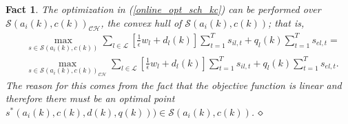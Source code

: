 \documentclass[conference]{IEEEtran}
\newtheorem{fact}{Fact}
\begin{document}
\begin{fact}
\label{fact_online_opt_kc}
The optimization in (\ref{online_opt_sch_kc}) can be performed over $\mathcal{S}(a_i(k),c(k))_\mathcal{CH}$, the convex hull of $\mathcal{S}(a_i(k),c(k))$; that is,
\begin{align*}
	& \max\limits_{s \in \mathcal{S}(a_i(k),c(k))} \sum\limits_{l \in \mathcal{L}} [\frac{1}{\epsilon} w_l+d_l(k)] \sum_{t=1}^{T} s_{il,t} + q_l(k) \sum_{t=1}^{T} s_{el,t} = \\
	& \max\limits_{s \in \mathcal{S}(a_i(k),c(k))_\mathcal{CH}} \sum\limits_{l \in \mathcal{L}} [\frac{1}{\epsilon} w_l+d_l(k)] \sum_{t=1}^{T} s_{il,t} + q_l(k) \sum_{t=1}^{T} s_{el,t}.
\end{align*}
The reason for this comes from the fact that the objective function is linear and therefore there must be an optimal point $s^*(a_i(k),c(k),d(k),q(k)) ) \in \mathcal{S}(a_i(k),c(k))$.
$\hfill \diamond$
\end{fact}
\end{document}
